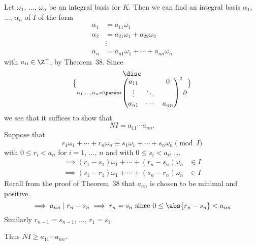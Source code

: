 Let $\omega_1$, $\dotsc$, $\omega_n$ be an integral basis for $K$.  Then we can find an integral basis $\alpha_1$, $\dotsc$, $\alpha_n$ of $I$ of the form
\begin{align*}
\alpha_1 &= a_{11} \omega_1 \\
\alpha_2 &= a_{21} \omega_1 + a_{22}\omega_2 \\
&\vdots \\
\alpha_n &= a_{n1} \omega_1 + \dotsb + a_{nn}\omega_n
\end{align*}
with $a_{ii}\in\Z^+$, by Theorem~38.  Since
\[ \disc\brace{\alpha_1,\dotsc,\alpha_n} = \paren*{\begin{pmatrix}
a_{11} & & 0 \\
\vdots & \ddots \\
a_{n1} & \cdots & a_{nn}
\end{pmatrix}}^2 D \]
we see that it suffices to show that
\[ NI = a_{11}\dotsm a_{nn} . \]
Suppose that
\[ r_1\omega_1 + \dotsb + r_n\omega_n \equiv s_1\omega_1 + \dotsb + s_n\omega_n \pmod{I} \]
with $0\leq r_i<a_{ii}$ for $i=1$, $\dotsc$, $n$ and with $0\leq s_i<a_{ii}$ \dots.
\begin{align*}
\implies (r_1-s_1)\omega_1 + \dotsb + (r_n-s_n)\omega_n &\in I \\
\implies (s_1-r_1)\omega_1 + \dotsb + (s_n-r_n)\omega_n &\in I
\end{align*}
Recall from the proof of Theorem~38 that $a_{nn}$ is chosen to be minimal and positive.
\[ \implies a_{nn} \mid r_n - s_n \implies r_n = s_n \text{ since } 0\leq\abs{r_n-s_n}<a_{nn} \]
Similarly $r_{n-1}=s_{n-1}$, $\dotsc$, $r_1=s_1$.

Thus $NI \geq a_{11}\dotsm a_{nn}$.

